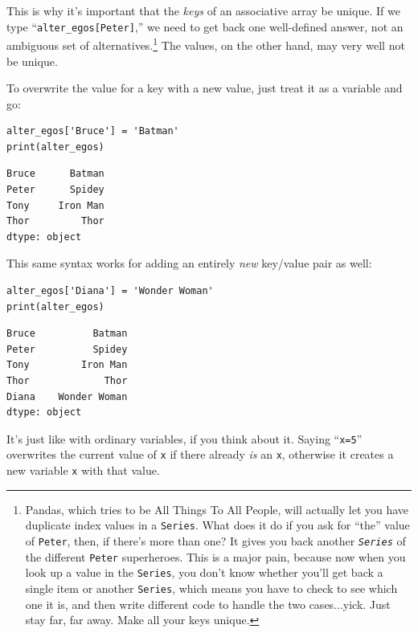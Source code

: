 
This is why it's important that the \textit{keys} of an associative array be
unique. If we type
``\texttt{alter\_egos[\textquotesingle Peter\textquotesingle]},'' we need to
get back one well-defined answer, not an ambiguous set of
alternatives.\footnote{Pandas, which tries to be All Things To All
People\texttrademark, will actually let you have duplicate index values in a
\texttt{Series}. What does it do if you ask for ``the'' value of
\texttt{Peter}, then, if there's more than one? It gives you back another
\textit{\texttt{Series}} of the different \texttt{Peter} superheroes. This is a
major pain, because now when you look up a value in the \texttt{Series}, you
don't know whether you'll get back a single item or another \texttt{Series},
which means you have to check to see which one it is, and then write different
code to handle the two cases...yick. Just stay far, far away. Make all your
keys unique.} The values, on the other hand, may very well not be unique.

To overwrite the value for a key with a new value, just treat it as a variable
and go:

\begin{Verbatim}[fontsize=\small,samepage=true,frame=single,framesep=3mm]
alter_egos['Bruce'] = 'Batman'
print(alter_egos)
\end{Verbatim}

\begin{Verbatim}[fontsize=\small,samepage=true,frame=leftline,framesep=5mm,framerule=1mm]
Bruce      Batman
Peter      Spidey
Tony     Iron Man
Thor         Thor
dtype: object
\end{Verbatim}

This same syntax works for adding an entirely \textit{new} key/value pair as
well:

\begin{Verbatim}[fontsize=\small,samepage=true,frame=single,framesep=3mm]
alter_egos['Diana'] = 'Wonder Woman'
print(alter_egos)
\end{Verbatim}

\begin{Verbatim}[fontsize=\small,samepage=true,frame=leftline,framesep=5mm,framerule=1mm]
Bruce          Batman
Peter          Spidey
Tony         Iron Man
Thor             Thor
Diana    Wonder Woman
dtype: object
\end{Verbatim}

It's just like with ordinary variables, if you think about it. Saying
``\texttt{x=5}'' overwrites the current value of \texttt{x} if there already
\textit{is} an \texttt{x}, otherwise it creates a new variable \texttt{x} with
that value.

